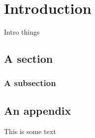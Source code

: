 \chapter{Introduction}
Intro things \lipsum
\cite{Munn1999,Chomsky1981}
\section{A section}
\lipsum[1]
\subsection{A subsection}
\lipsum[2]




\begin{appendix}
\chapter{An appendix}
This is some text
\end{appendix}
